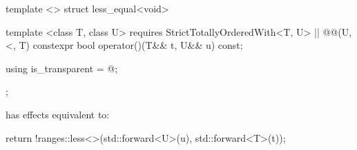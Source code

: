 {%
\begin{itemdecl}
template <> struct less_equal<void> {
  template <class T, class U>
    requires StrictTotallyOrderedWith<T, U> || @\textit{}@(U, <, T)
  constexpr bool operator()(T&& t, U&& u) const;

  using is_transparent = @\unspec@;
};
\end{itemdecl}

\begin{itemdescr}
\pnum
{} has effects equivalent to:
\begin{codeblock}
return !ranges::less<>{}(std::forward<U>(u), std::forward<T>(t));
\end{codeblock}
\end{itemdescr}
} %
